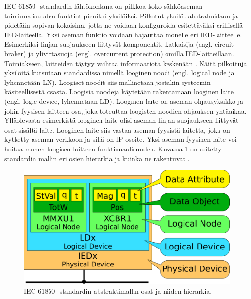 IEC 61850 -standardin lähtökohtana on pilkkoa koko sähköaseman toiminnalisuuden funktiot pieniksi yksilöiksi. Pilkotut yksilöt abstrahoidaan ja pidetään sopivan kokoisina, jotta ne voidaan konfiguroida esitettäväksi erillisellä IED-laiteella. Yksi aseman funktio voidaan hajauttaa monelle eri IED-laitteelle. Esimerkiksi linjan suojaukseen liittyvät komponentit, katkaisija (engl. circuit braker) ja ylivirtasuoja (engl. overcurrent protection) omilla IED-laitteillaan. Toimiakseen, laitteiden täytyy vaihtaa informaatiota keskenään \cite[s.~31]{IEC61850-7-1}. Näitä pilkottuja yksilöitä kutsutaan standardissa nimellä looginen noodi (engl. logical node ja lyhennetään LN). Loogiset noodit siis mallinetaan jostakin systeemin käsiteellisestä osasta. Loogisia noodeja käytetään rakentamaan looginen laite (engl. logic device, lyhennetään LD). Looginen laite on aseman ohjausyksikkö ja jokin fyysisen laitteen osa, joka toteuttaa loogisten noodien ohjauksen yhtäaikaa. Ylläolevasta esimerkistä looginen laite olisi aseman linjan suojaukseen liittyvät osat sisältä laite. Looginen laite siis vastaa aseman fyysistä laitetta, joka on kytketty aseman verkkoon ja sillä on IP-osoite. Yksi aseman fyysinen laite voi hoitaa monen loogisen laitteen funktionaalisuuden. Kuvassa \ref{fig:iec61850-data-modeling} on esitetty standardin mallin eri osien hierarkia ja kuinka ne rakentuvat \cite[s.~2]{Camachi2017} \cite[s.~24]{IEC61850-1}.

\begin{figure}
	\includegraphics[width=1\textwidth]{pictures/iec61850-data-modeling.png}
	\caption{IEC 61850 -standardin abstraktimallin osat ja niiden hierarkia.}
	\label{fig:iec61850-data-modeling}
\end{figure}

